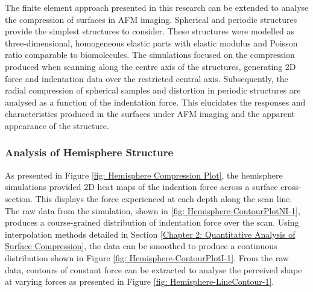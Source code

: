 The finite element approach presented in this research can be extended to analyse the compression of surfaces in AFM imaging. Spherical and periodic structures provide the simplest structures to consider. These structures were modelled as three-dimensional, homogeneous elastic parts with elastic modulus and Poisson ratio comparable to biomolecules. The simulations focused on the compression produced when scanning along the centre axis of the structures, generating 2D force and indentation data over the restricted central axis. Subsequently, the radial compression of spherical samples and distortion in periodic structures are analysed as a function of the indentation force. This elucidates the responses and characteristics produced in the surfaces under AFM imaging and the apparent appearance of the structure.   

\subsubsection{Analysis of Hemisphere Structure}

As presented in Figure \ref{fig: Hemisphere Compression Plot}, the hemisphere simulations provided 2D heat maps of the indention force across a surface cross-section. This displays the force experienced at each depth along the scan line. The raw data from the simulation, shown in \ref{fig: Hemisphere-ContourPlotNI-1}, produces a course-grained distribution of indentation force over the scan. Using interpolation methods detailed in Section \ref{Chapter 2: Quantitative Analysis of Surface Compression}, the data can be smoothed to produce a continuous distribution shown in Figure \ref{fig: Hemisphere-ContourPlotI-1}. From the raw data, contours of constant force can be extracted to analyse the perceived shape at varying forces as presented in Figure \ref{fig: Hemisphere-LineContour-1}.

